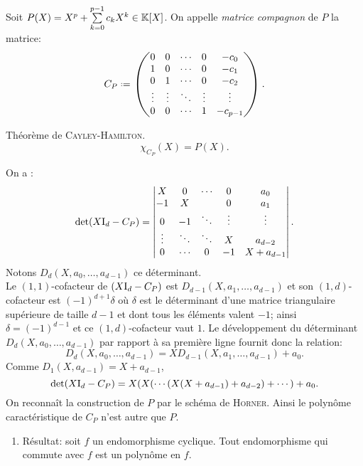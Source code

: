 \begin{defi}
    Soit $P(X) = X^p + \sum\limits_{k=0}^{p-1} c_kX^k \in \mathbb{K}[X]$. On appelle \emph{matrice compagnon} de $P$ la matrice:
$$ C_P \defeq
\begin{pmatrix}
0 & 0 & \cdots & 0 & -c_0\\
1 & 0 & \cdots & 0 & -c_1\\
0 & 1 & \cdots & 0 & -c_2\\
\vdots & \vdots & \ddots & \vdots & \vdots\\
0 & 0 & \cdots & 1 & -c_{p-1}
\end{pmatrix}.
$$
\end{defi}

\begin{theo}
    Théorème de \textsc{Cayley}-\textsc{Hamilton}.
    $$\chi_{C_P}(X) = P(X).$$
\end{theo}    

\begin{preuve}
    On a :
    $$
    \det(X \mathrm{I}_d - C_P) = 
    \begin{vmatrix}
        X & 0 & \cdots & 0 & a_0 \\
        -1 & X & & 0 & a_1 \\
        0 & -1 & \ddots & \vdots & \vdots \\
        \vdots & \ddots & \ddots & X & a_{d-2} \\
        0 & \cdots & 0 & -1 & X + a_{d-1}
    \end{vmatrix}.
    $$
    Notons $D_d(X, a_0, \dots, a_{d-1})$ ce déterminant. \\
    Le $(1,1)$-cofacteur de $(X \mathrm{I}_d - C_P)$ est $D_{d-1}(X, a_1, \dots, a_{d-1})$ et son $(1,d)$-cofacteur est $(-1)^{d+1} \delta$ où $\delta$ est le déterminant d'une matrice triangulaire supérieure de taille $d-1$ et dont tous les éléments valent $-1$; ainsi $\delta = (-1)^{d-1}$ et ce $(1,d)$-cofacteur vaut $1$. Le développement du déterminant $D_d(X, a_0, \dots, a_{d-1})$ par rapport à sa première ligne fournit donc la relation:
    $$D_d(X, a_0, \dots, a_{d-1}) = X D_{d-1}(X, a_1, \dots, a_{d-1}) + a_0.$$
    Comme $D_1(X, a_{d-1}) = X + a_{d-1}$,
    $$\det(X \mathrm{I}_d - C_P) = X(X(\cdots(X(X+a_{d-1}) + a_{d-2}) + \cdots) + a_0.$$
    On reconnaît la construction de $P$ par le schéma de \textsc{Horner}. Ainsi le polynôme caractéristique de $C_P$ n'est autre que $P$. 
\end{preuve} 

\begin{enumerate}
    \item Résultat: soit $f$ un endomorphisme cyclique. Tout endomorphisme qui commute avec $f$ est un polynôme en $f$.
\end{enumerate}

